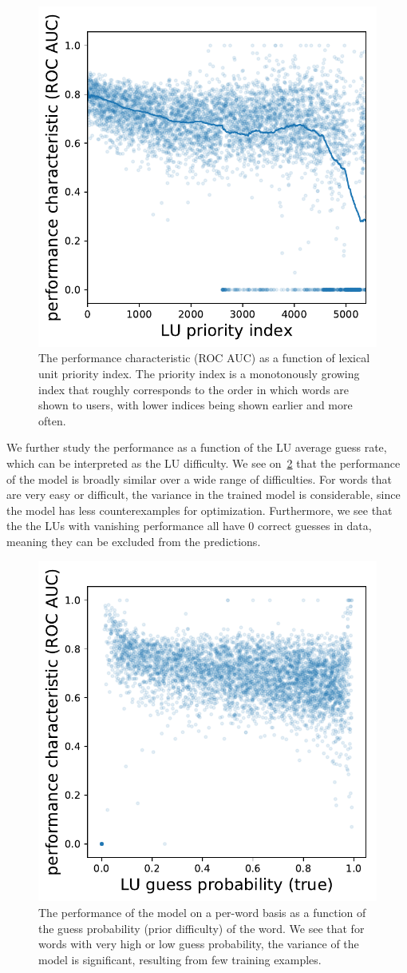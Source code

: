 \begin{figure}[ht]
\centering
\includegraphics[width=0.5\linewidth]{figures/lingvist/lu_roc_prio.pdf}
\caption[Performance of knowledge estimation as a function of LU priority.]{The performance characteristic (ROC AUC) as a function of lexical unit priority index. The priority index is a monotonously growing index that roughly corresponds to the order in which words are shown to users, with lower indices being shown earlier and more often.}
\label{fig:lu_roc_prio}
\end{figure}

We further study the performance as a function of the LU average guess rate, which can be interpreted as the LU difficulty. We see on~\cref{fig:lu_roc_guess_proba} that the performance of the model is broadly similar over a wide range of difficulties. For words that are very easy or difficult, the variance in the trained model is considerable, since the model has less counterexamples for optimization. Furthermore, we see that the the LUs with vanishing performance all have 0 correct guesses in data, meaning they can be excluded from the predictions.

\begin{figure}[ht]
\centering
\includegraphics[width=0.5\linewidth]{figures/lingvist/lu_roc_guess_proba.pdf}
\caption[Model performance on a per-LU basis as a function of average LU guess probability.]{The performance of the model on a per-word basis as a function of the guess probability (prior difficulty) of the word. We see that for words with very high or low guess probability, the variance of the model is significant, resulting from few training examples.}
\label{fig:lu_roc_guess_proba}
\end{figure}

